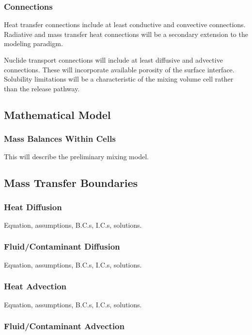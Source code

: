 \subsubsection{Connections}

Heat transfer connections include at least conductive and convective connections. 
Radiative and mass transfer heat connections will be a secondary extension to 
the modeling paradigm. 

Nuclide transport connections will include at least diffusive and advective 
connections. These will incorporate available porosity of the surface interface. 
Solubility limitations will be a characteristic of the mixing volume cell rather  
than the release pathway. 

\subsection{Mathematical Model}

\subsubsection{Mass Balances Within Cells}

This will describe the preliminary mixing model.

\subsection{Mass Transfer Boundaries}

\subsubsection{Heat Diffusion}

Equation, assumptions, B.C.s, I.C.s, solutions.

\subsubsection{Fluid/Contaminant Diffusion}

Equation, assumptions, B.C.s, I.C.s, solutions.

\subsubsection{Heat Advection}

Equation, assumptions, B.C.s, I.C.s, solutions.

\subsubsection{Fluid/Contaminant Advection}

